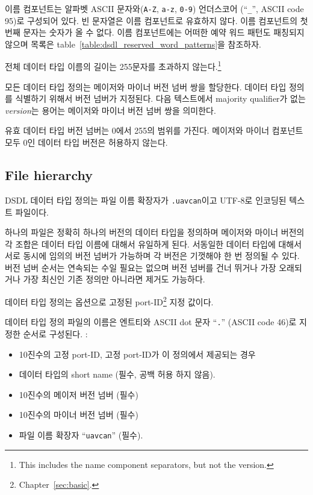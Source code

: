 이름 컴포넌트는 알파벳 ASCII 문자와(\verb|A-Z|, \verb|a-z|, \verb|0-9|) 언더스코어 (``\verb|_|'', ASCII code 95)로 구성되어 있다.
빈 문자열은 이름 컴포넌트로 유효하지 않다.
이름 컴포넌트의 첫번째 문자는 숫자가 올 수 없다.
이름 컴포넌트에는 어떠한 예약 워드 패턴도 패칭되지 않으며 목록은 table~\ref{table:dsdl_reserved_word_patterns}을 참조하자.

전체 데이터 타입 이름의 길이는 255문자를 초과하지 않는다.\footnote{This includes the name component separators, but not the version.}

모든 데이터 타입 정의는 메이저와 마이너 버전 넘버 쌍을 할당한다.
데이터 타입 정의를 식별하기 위해서 버전 넘버가 지정된다.
다음 텍스트에서 majority qualifier가 없는 \emph{version}는 용어는 메이저와 마이너 버전 넘버 쌍을 의미한다.

유효 데이터 타입 버전 넘버는 0에서 255의 범위를 가진다.
메이저와 마이너 컴포넌트 모두 0인 데이터 타입 버전은 허용하지 않는다.

\subsection{File hierarchy}

DSDL 데이터 타입 정의는 파일 이름 확장자가 \verb|.uavcan|이고 UTF-8로 인코딩된 텍스트 파일이다.

하나의 파일은 정확히 하나의 버전의 데이터 타입을 정의하며 메이저와 마이너 버전의 각 조합은 데이터 타입 이름에 대해서 유일하게 된다.
서동일한 데이터 타입에 대해서 서로 동시에 임의의 버전 넘버가 가능하며 각 버전은 기껏해야 한 번 정의될 수 있다.
버전 넘버 순서는 연속되는 수일 필요는 없으며 버전 넘버를 건너 뛰거나 가장 오래되거나 가장 최신인 기존 정의만 아니라면 제거도 가능하다.

데이터 타입 정의는 옵션으로 고정된 port-ID\footnote{Chapter~\ref{sec:basic}.} 지정 값이다.

데이터 타입 정의 파일의 이름은 엔트티와 ASCII dot 문자 ``\verb|.|'' (ASCII code 46)로 지정한 순서로 구성된다. :
\begin{itemize}
    \item 10진수의 고정 port-ID, 고정 port-ID가 이 정의에서 제공되는 경우
    \item 데이터 타입의 short name (필수, 공백 허용 하지 않음).
    \item 10진수의 메이저 버전 넘버 (필수)
    \item 10진수의 마이너 버전 넘버 (필수)
    \item 파일 이름 확장자 ``\verb|uavcan|'' (필수).
\end{itemize}

